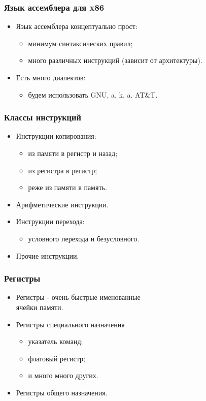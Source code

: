\begin{frame}
\frametitle{Язык ассемблера для x86}
\begin{itemize}
    \item<1-> Язык ассемблера концептуально прост:
    \begin{itemize}
        \item минимум синтаксических правил;
        \item много различных инструкций (зависит от архитектуры).
    \end{itemize}
    \item<2-> Есть много диалектов:
    \begin{itemize}
        \item будем использовать GNU, a. k. a. AT\&T.
    \end{itemize}
\end{itemize}
\end{frame}

\begin{frame}
\frametitle{Классы инструкций}
\begin{itemize}
    \item<1-> Инструкции копирования:
    \begin{itemize}
        \item из памяти в регистр и назад;
        \item из регистра в регистр;
        \item реже из памяти в память.
    \end{itemize}
    \item<2-> Арифметические инструкции.
    \item<3-> Инструкции перехода:
    \begin{itemize}
        \item условного перехода и безусловного.
    \end{itemize}
    \item<4-> Прочие инструкции.
\end{itemize}
\end{frame}

\begin{frame}
\frametitle{Регистры}
\begin{itemize}
    \item<1-> Регистры - очень быстрые именованные\\ячейки памяти.
    \item<2-> Регистры специального назначения
    \begin{itemize}
        \item указатель команд;
        \item флаговый регистр;
        \item и много много других.
    \end{itemize}
    \item<3-> Регистры общего назначения.
\end{itemize}
\end{frame}

